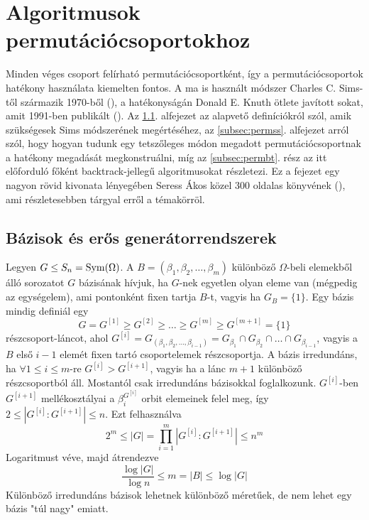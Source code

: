 \section{Algoritmusok permutációcsoportokhoz}
\label{sec:permutacio}
Minden véges csoport felírható permutációcsoportként, így a permutációcsoportok hatékony használata kiemelten fontos.
A ma is használt módszer Charles C. Sims-től származik 1970-ből (\cite{Sim70}), a hatékonyságán Donald E. Knuth ötlete javított sokat, amit 1991-ben publikált (\cite{Knu91}).
Az \ref{subsec:permdef}. alfejezet az alapvető definíciókról szól, amik szükségesek Sims módszerének megértéséhez,
az \ref{subsec:permss}. alfejezet arról szól, hogy hogyan tudunk egy tetszőleges módon megadott permutációcsoportnak a hatékony megadását megkonstruálni,
míg az \ref{subsec:permbt}. rész az itt előforduló főként backtrack-jellegű algoritmusokat részletezi.
Ez a fejezet egy nagyon rövid kivonata lényegében Seress Ákos közel 300 oldalas könyvének (\cite{Ser03}), ami részletesebben tárgyal erről a témakörröl.

\subsection{Bázisok és erős generátorrendszerek}
\label{subsec:permdef}
Legyen $G \le S_n = \operatorname{Sym}(\Omega)$.
A $B=(\beta_1,\beta_2,\dots,\beta_m)$ különböző $\Omega$-beli elemekből álló sorozatot $G$ bázisának hívjuk,
ha $G$-nek egyetlen olyan eleme van (mégpedig az egységelem), ami pontonként fixen tartja $B$-t, vagyis ha $G_B=\{1\}$.
Egy bázis mindig definiál egy
\begin{equation}
\label{eq:permlanc}
G = G^{[1]} \ge G^{[2]} \ge \dots \ge G^{[m]} \ge G^{[m+1]} = \{1\}
\end{equation}
részcsoport-láncot, ahol $G^{[i]}=G_{(\beta_1,\beta_2,\dots,\beta_{i-1})}=G_{\beta_1}\cap G_{\beta_2}\cap\dots\cap G_{\beta_{i-1}}$, vagyis a $B$ első $i-1$ elemét fixen tartó csoportelemek részcsoportja.
A bázis irredundáns, ha $\forall 1\le i \le m$-re $G^{[i]} > G^{[i+1]}$, vagyis ha a lánc $m+1$ különböző részcsoportból áll.
Mostantól csak irredundáns bázisokkal foglalkozunk.
$G^{[i]}$-ben $G^{[i+1]}$ mellékosztályai a $\beta_i^{G^{[i]}}$ orbit elemeinek felel meg, így $2 \le \left| G^{[i]} : G^{[i+1]} \right| \le n$.
Ezt felhasználva
\begin{equation}
\label{eq:permmeret}
2^m \le |G|=\prod_{i=1}^m \left| G^{[i]} : G^{[i+1]} \right| \le n^m
\end{equation}
Logaritmust véve, majd átrendezve
\begin{equation}
\label{eq:permmeret2}
\frac{\log |G|}{\log n} \le m = |B| \le \log |G|
\end{equation}
Különböző irredundáns bázisok lehetnek különböző méretűek, de nem lehet egy bázis "túl nagy" emiatt.

